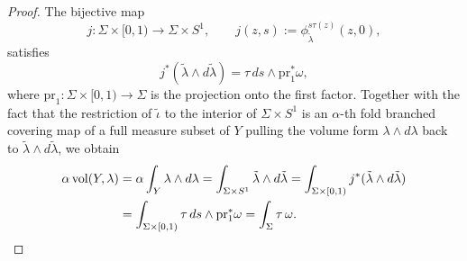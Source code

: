 \documentclass[10pt,a4paper]{article}
\theoremstyle{definition}
\newcommand{\vol}{\mathrm{vol}}
\newcommand{\pr}{\mathrm{pr}}
\begin{document}
\begin{proof}
The bijective map
\[
j: \Sigma \times [0,1) \to \Sigma \times S^1, \qquad j(z,s) := \phi_{\tilde{\lambda}}^{s\tau(z)} (z,0),
\]
satisfies
\[
j^*(\tilde\lambda \wedge d\tilde\lambda) = \tau\, ds \wedge \mathrm{pr}_1^* \omega,
\]
where $\pr_1:\Sigma\times [0,1) \to\Sigma$ is the projection onto the first factor. Together with the fact that the restriction of $\tilde{\iota}$ to the interior of $\Sigma\times S^1$
is an $\alpha$-th fold branched covering map of a full measure subset of $Y$ pulling the volume form $\lambda\wedge d\lambda$ back to $\tilde\lambda \wedge d\tilde\lambda$, we obtain
\begin{align*}
\alpha\, \vol(Y,\lambda) &= \alpha \int_Y \lambda \wedge d\lambda = \int_{\Sigma\times S^1} \tilde\lambda \wedge d\tilde\lambda = \int_{\Sigma\times [0,1)} j^*( \tilde\lambda \wedge d\tilde\lambda) \\ &= \int_{\Sigma\times [0,1)} \tau\, ds \wedge \mathrm{pr}_1^* \omega = \int_{\Sigma} \tau \, \omega.\qedhere
\end{align*}
\end{proof}
\end{document}

